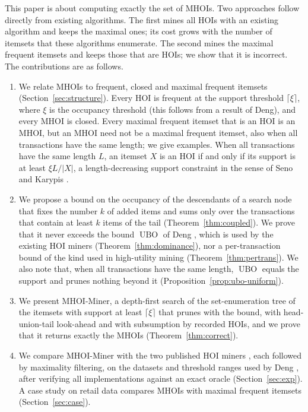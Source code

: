 \documentclass[pdflatex,sn-mathphys,Numbered]{sn-jnl}
\theoremstyle{thmstyleone}
\theoremstyle{thmstyletwo}
\theoremstyle{thmstylethree}
\newcommand{\ubo}{\operatorname{UBO}}
\newcommand{\Algo}{MHOI-Miner}
\begin{document}
This paper is about computing exactly the set of MHOIs. Two approaches follow directly from existing algorithms. The first mines all HOIs with an existing algorithm \cite{deng2020hoi,nguyen2023dfhoi} and keeps the maximal ones; its cost grows with the number of itemsets that these algorithms enumerate. The second mines the maximal frequent itemsets and keeps those that are HOIs; we show that it is incorrect. The contributions are as follows.
\begin{enumerate}
\item We relate MHOIs to frequent, closed and maximal frequent itemsets (Section~\ref{sec:structure}). Every HOI is frequent at the support threshold $\lceil \xi \rceil$, where $\xi$ is the occupancy threshold (this follows from a result of Deng), and every MHOI is closed. Every maximal frequent itemset that is an HOI is an MHOI, but an MHOI need not be a maximal frequent itemset, also when all transactions have the same length; we give examples. When all transactions have the same length $L$, an itemset $X$ is an HOI if and only if its support is at least $\xi L / |X|$, a length-decreasing support constraint in the sense of Seno and Karypis \cite{seno2005ldsc}.
\item We propose a bound on the occupancy of the descendants of a search node that fixes the number $k$ of added items and sums only over the transactions that contain at least $k$ items of the tail (Theorem~\ref{thm:coupled}). We prove that it never exceeds the bound $\ubo$ of Deng \cite{deng2020hoi}, which is used by the existing HOI miners (Theorem~\ref{thm:dominance}), nor a per-transaction bound of the kind used in high-utility mining (Theorem~\ref{thm:pertrans}). We also note that, when all transactions have the same length, $\ubo$ equals the support and prunes nothing beyond it (Proposition~\ref{prop:ubo-uniform}).
\item We present \Algo{}, a depth-first search of the set-enumeration tree of the itemsets with support at least $\lceil \xi \rceil$ that prunes with the bound, with head-union-tail look-ahead and with subsumption by recorded HOIs, and we prove that it returns exactly the MHOIs (Theorem~\ref{thm:correct}).
\item We compare \Algo{} with the two published HOI miners \cite{deng2020hoi,nguyen2023dfhoi}, each followed by maximality filtering, on the datasets and threshold ranges used by Deng \cite{deng2020hoi}, after verifying all implementations against an exact oracle (Section~\ref{sec:exp}). A case study on retail data compares MHOIs with maximal frequent itemsets (Section~\ref{sec:case}).
\end{enumerate}
\end{document}
